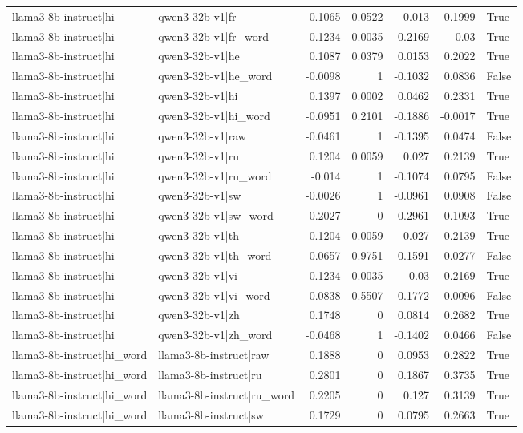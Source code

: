 \begin{table}
\begin{tabular}{l l r r r r l}
llama3-8b-instruct|hi & qwen3-32b-v1|fr & 0.1065 & 0.0522 & 0.013 & 0.1999 & True \\
llama3-8b-instruct|hi & qwen3-32b-v1|fr_word & -0.1234 & 0.0035 & -0.2169 & -0.03 & True \\
llama3-8b-instruct|hi & qwen3-32b-v1|he & 0.1087 & 0.0379 & 0.0153 & 0.2022 & True \\
llama3-8b-instruct|hi & qwen3-32b-v1|he_word & -0.0098 & 1 & -0.1032 & 0.0836 & False \\
llama3-8b-instruct|hi & qwen3-32b-v1|hi & 0.1397 & 0.0002 & 0.0462 & 0.2331 & True \\
llama3-8b-instruct|hi & qwen3-32b-v1|hi_word & -0.0951 & 0.2101 & -0.1886 & -0.0017 & True \\
llama3-8b-instruct|hi & qwen3-32b-v1|raw & -0.0461 & 1 & -0.1395 & 0.0474 & False \\
llama3-8b-instruct|hi & qwen3-32b-v1|ru & 0.1204 & 0.0059 & 0.027 & 0.2139 & True \\
llama3-8b-instruct|hi & qwen3-32b-v1|ru_word & -0.014 & 1 & -0.1074 & 0.0795 & False \\
llama3-8b-instruct|hi & qwen3-32b-v1|sw & -0.0026 & 1 & -0.0961 & 0.0908 & False \\
llama3-8b-instruct|hi & qwen3-32b-v1|sw_word & -0.2027 & 0 & -0.2961 & -0.1093 & True \\
llama3-8b-instruct|hi & qwen3-32b-v1|th & 0.1204 & 0.0059 & 0.027 & 0.2139 & True \\
llama3-8b-instruct|hi & qwen3-32b-v1|th_word & -0.0657 & 0.9751 & -0.1591 & 0.0277 & False \\
llama3-8b-instruct|hi & qwen3-32b-v1|vi & 0.1234 & 0.0035 & 0.03 & 0.2169 & True \\
llama3-8b-instruct|hi & qwen3-32b-v1|vi_word & -0.0838 & 0.5507 & -0.1772 & 0.0096 & False \\
llama3-8b-instruct|hi & qwen3-32b-v1|zh & 0.1748 & 0 & 0.0814 & 0.2682 & True \\
llama3-8b-instruct|hi & qwen3-32b-v1|zh_word & -0.0468 & 1 & -0.1402 & 0.0466 & False \\
llama3-8b-instruct|hi_word & llama3-8b-instruct|raw & 0.1888 & 0 & 0.0953 & 0.2822 & True \\
llama3-8b-instruct|hi_word & llama3-8b-instruct|ru & 0.2801 & 0 & 0.1867 & 0.3735 & True \\
llama3-8b-instruct|hi_word & llama3-8b-instruct|ru_word & 0.2205 & 0 & 0.127 & 0.3139 & True \\
llama3-8b-instruct|hi_word & llama3-8b-instruct|sw & 0.1729 & 0 & 0.0795 & 0.2663 & True \\

\end{tabular}
\end{table}
